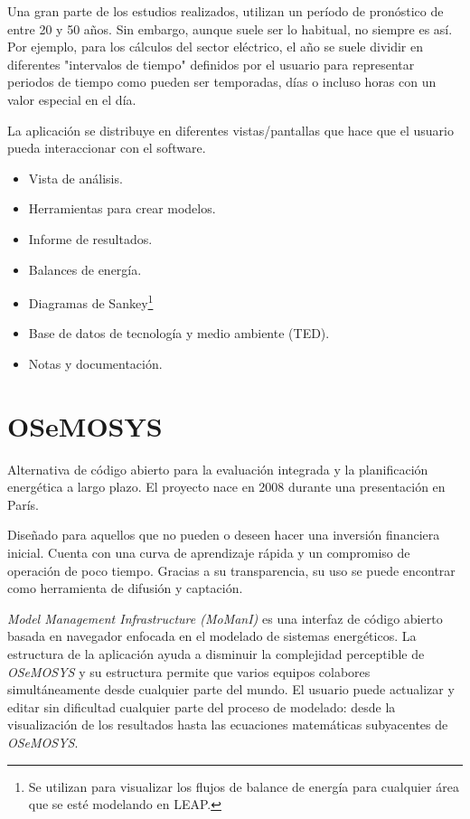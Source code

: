 Una gran parte de los estudios realizados, utilizan un período de pronóstico de entre 20 y 50 años. Sin embargo, aunque suele ser lo habitual, no siempre es así. Por ejemplo, para los cálculos del sector eléctrico, el año se suele dividir en diferentes "intervalos de tiempo" definidos por el usuario para representar periodos de tiempo como pueden ser temporadas, días o incluso horas con un valor especial en el día.

La aplicación se distribuye en diferentes vistas/pantallas que hace que el usuario pueda interaccionar con el software.

\begin{itemize}
	\item Vista de análisis.
	\item Herramientas para crear modelos.
	\item Informe de resultados.
	\item Balances de energía.
	\item Diagramas de Sankey\footnote{Se utilizan para visualizar los flujos de balance de energía para cualquier área que se esté modelando en LEAP.}
	\item Base de datos de tecnología y medio ambiente (TED).
	\item Notas y documentación.
\end{itemize}

\section{OSeMOSYS}

Alternativa de código abierto para la evaluación integrada y la planificación energética a largo plazo. El proyecto nace en 2008 durante una presentación en París.

Diseñado para aquellos que no pueden o deseen hacer una inversión financiera inicial. Cuenta con una curva de aprendizaje rápida y un compromiso de operación de poco tiempo. Gracias a su transparencia, su uso se puede encontrar como herramienta de difusión y captación.

\textit{Model Management Infrastructure (MoManI)} es una interfaz de código abierto basada en navegador enfocada en el modelado de sistemas energéticos. La estructura de la aplicación ayuda a disminuir la complejidad perceptible de \textit{OSeMOSYS} y su estructura permite que varios equipos colabores simultáneamente desde cualquier parte del mundo.
El usuario puede actualizar y editar sin dificultad cualquier parte del proceso de modelado: desde la visualización de los resultados hasta las ecuaciones matemáticas subyacentes de \textit{OSeMOSYS}.

